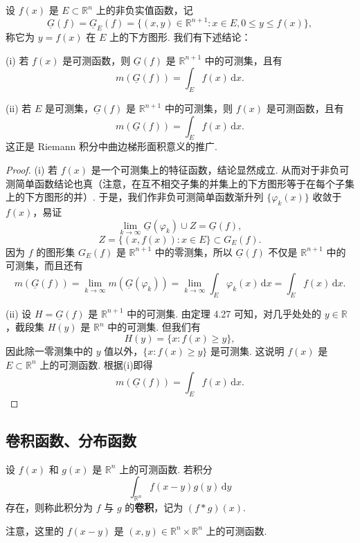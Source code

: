 \documentclass[../../main.tex]{subfiles}
\begin{document}
\begin{theorem}[积分的几何意义]\label{theorem:积分的几何意义}
设 \( f(x) \) 是 \( E \subset \mathbb{R}^n \) 上的非负实值函数，记
\[
\underline{G}(f) = \underline{G}_E(f) = \{ (x, y) \in \mathbb{R}^{n + 1} : x \in E, 0 \leqslant y \leqslant f(x) \},
\]
称它为 \( y = f(x) \) 在 \( E \) 上的下方图形. 我们有下述结论：

(i) 若 \( f(x) \) 是可测函数，则 \( \underline{G}(f) \) 是 \( \mathbb{R}^{n + 1} \) 中的可测集，且有
\[
m(\underline{G}(f)) = \int_E f(x) \, \mathrm{d}x.
\]

(ii) 若 \( E \) 是可测集，\( \underline{G}(f) \) 是 \( \mathbb{R}^{n + 1} \) 中的可测集，则 \( f(x) \) 是可测函数，且有
\[
m(\underline{G}(f)) = \int_E f(x) \, \mathrm{d}x.
\]
这正是 Riemann 积分中曲边梯形面积意义的推广.
\end{theorem}
\begin{proof}
(i) 若 \( f(x) \) 是一个可测集上的特征函数，结论显然成立. 从而对于非负可测简单函数结论也真（注意，在互不相交子集的并集上的下方图形等于在每个子集上的下方图形的并）. 于是，我们作非负可测简单函数渐升列 \( \{ \varphi_k(x) \} \) 收敛于 \( f(x) \)，易证
\[
\lim_{k \to \infty} \underline{G}(\varphi_k) \cup Z = \underline{G}(f),
\]
\[
Z = \{ (x, f(x)) : x \in E \} \subset G_E(f).
\]
因为 \( f \) 的图形集 \( G_E(f) \) 是 \( \mathbb{R}^{n + 1} \) 中的零测集，所以 \( \underline{G}(f) \) 不仅是 \( \mathbb{R}^{n + 1} \) 中的可测集，而且还有
\[
m(\underline{G}(f)) = \lim_{k \to \infty} m(\underline{G}(\varphi_k)) = \lim_{k \to \infty} \int_E \varphi_k(x) \, \mathrm{d}x = \int_E f(x) \, \mathrm{d}x.
\]

(ii) 设 \( H = \underline{G}(f) \) 是 \( \mathbb{R}^{n + 1} \) 中的可测集. 由定理 4.27 可知，对几乎处处的 \( y \in \mathbb{R} \)，截段集 \( H(y) \) 是 \( \mathbb{R}^n \) 中的可测集. 但我们有
\[
H(y) = \{ x : f(x) \geqslant y \},
\]
因此除一零测集中的 \( y \) 值以外，\( \{ x : f(x) \geqslant y \} \) 是可测集. 这说明 \( f(x) \) 是 \( E \subset \mathbb{R}^n \) 上的可测函数. 根据(i)即得
\[
m(\underline{G}(f)) = \int_E f(x) \, \mathrm{d}x.
\]
\end{proof}



\subsection{卷积函数、分布函数}

\begin{definition}[卷积]
设 \( f(x) \) 和 \( g(x) \) 是 \( \mathbb{R}^n \) 上的可测函数. 若积分
\[
\int_{\mathbb{R}^n} f(x - y) g(y) \, \mathrm{d}y
\]
存在，则称此积分为 \( f \) 与 \( g \) 的\textbf{卷积}，记为 \( (f * g)(x) \).
\end{definition}
\begin{remark}
注意，这里的 \( f(x - y) \) 是 \( (x, y) \in \mathbb{R}^n \times \mathbb{R}^n \) 上的可测函数.
\end{remark}
\end{document}
